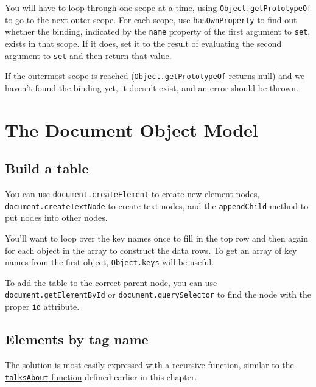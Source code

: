 You will have to loop through one scope at a time, using \lstinline`Object.getPrototypeOf` to go to the next outer scope. For each scope, use \lstinline`hasOwnProperty` to find out whether the binding, indicated by the \lstinline`name` property of the first argument to \lstinline`set`, exists in that scope. If it does, set it to the result of evaluating the second argument to \lstinline`set` and then return that value.

If the outermost scope is reached (\lstinline`Object.getPrototypeOf` returns null) and we haven't found the binding yet, it doesn't exist, and an error should be thrown.

\section{The Document Object Model}

\subsection{Build a table}

You can use \lstinline`document.createElement` to create new element nodes, \lstinline`document.createTextNode` to create text nodes, and the \lstinline`appendChild` method to put nodes into other nodes.

You'll want to loop over the key names once to fill in the top row and then again for each object in the array to construct the data rows. To get an array of key names from the first object, \lstinline`Object.keys` will be useful.

To add the table to the correct parent node, you can use \lstinline`document.getElementById` or \lstinline`document.querySelector` to find the node with the proper \lstinline`id` attribute.

\subsection{Elements by tag name}

The solution is most easily expressed with a recursive function, similar to the \hyperref[dom.talksAbout]{\lstinline`talksAbout` function} defined earlier in this chapter.

